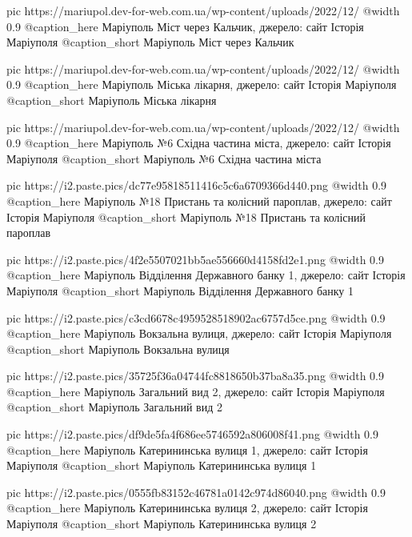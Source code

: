   pic https://mariupol.dev-for-web.com.ua/wp-content/uploads/2022/12/%
  @width 0.9
  @caption_here Маріуполь Міст через Кальчик, джерело: сайт Історія Маріуполя
  @caption_short Маріуполь Міст через Кальчик

  pic https://mariupol.dev-for-web.com.ua/wp-content/uploads/2022/12/%
  @width 0.9
  @caption_here Маріуполь Міська лікарня, джерело: сайт Історія Маріуполя
  @caption_short Маріуполь Міська лікарня

  pic https://mariupol.dev-for-web.com.ua/wp-content/uploads/2022/12/%
  @width 0.9
  @caption_here Маріуполь №6 Східна частина міста, джерело: сайт Історія Маріуполя
  @caption_short Маріуполь №6 Східна частина міста

  pic https://i2.paste.pics/dc77e95818511416c5c6a6709366d440.png
  @width 0.9
  @caption_here Маріуполь №18 Пристань та колісний пароплав, джерело: сайт Історія Маріуполя
  @caption_short Маріуполь №18 Пристань та колісний пароплав

  pic https://i2.paste.pics/4f2e5507021bb5ae556660d4158fd2e1.png
  @width 0.9
  @caption_here Маріуполь Відділення Державного банку 1, джерело: сайт Історія Маріуполя
  @caption_short Маріуполь Відділення Державного банку 1

  pic https://i2.paste.pics/c3cd6678c4959528518902ac6757d5ce.png
  @width 0.9
  @caption_here Маріуполь Вокзальна вулиця, джерело: сайт Історія Маріуполя
  @caption_short Маріуполь Вокзальна вулиця

  pic https://i2.paste.pics/35725f36a04744fc8818650b37ba8a35.png
  @width 0.9
  @caption_here Маріуполь Загальний вид 2, джерело: сайт Історія Маріуполя
  @caption_short Маріуполь Загальний вид 2

  pic https://i2.paste.pics/df9de5fa4f686ee5746592a806008f41.png
  @width 0.9
  @caption_here Маріуполь Катерининська вулиця 1, джерело: сайт Історія Маріуполя
  @caption_short Маріуполь Катерининська вулиця 1

  pic https://i2.paste.pics/0555fb83152c46781a0142c974d86040.png
  @width 0.9
  @caption_here Маріуполь Катерининська вулиця 2, джерело: сайт Історія Маріуполя
  @caption_short Маріуполь Катерининська вулиця 2


